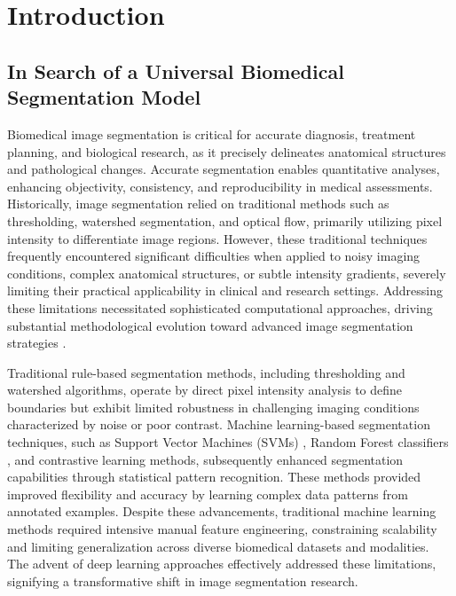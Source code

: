 \documentclass[./dissertation.tex]{subfiles}
\begin{document}
\chapter{Introduction}
\label{ch:intro}

\section{In Search of a Universal Biomedical Segmentation Model}
Biomedical image segmentation is critical for accurate diagnosis, treatment planning, and biological research, as it precisely delineates anatomical structures and pathological changes. Accurate segmentation enables quantitative analyses, enhancing objectivity, consistency, and reproducibility in medical assessments. Historically, image segmentation relied on traditional methods such as thresholding, watershed segmentation, and optical flow, primarily utilizing pixel intensity to differentiate image regions. However, these traditional techniques frequently encountered significant difficulties when applied to noisy imaging conditions, complex anatomical structures, or subtle intensity gradients, severely limiting their practical applicability in clinical and research settings. Addressing these limitations necessitated sophisticated computational approaches, driving substantial methodological evolution toward advanced image segmentation strategies \cite{isensee2021nnu, hatamizadeh2022unetr}.


Traditional rule-based segmentation methods, including thresholding and watershed algorithms, operate by direct pixel intensity analysis to define boundaries but exhibit limited robustness in challenging imaging conditions characterized by noise or poor contrast. Machine learning-based segmentation techniques, such as Support Vector Machines (SVMs) \cite{cortes1995support}, Random Forest classifiers \cite{breiman2001random}, and contrastive learning methods, subsequently enhanced segmentation capabilities through statistical pattern recognition. These methods provided improved flexibility and accuracy by learning complex data patterns from annotated examples. Despite these advancements, traditional machine learning methods required intensive manual feature engineering, constraining scalability and limiting generalization across diverse biomedical datasets and modalities. The advent of deep learning approaches effectively addressed these limitations, signifying a transformative shift in image segmentation research.
\end{document}
